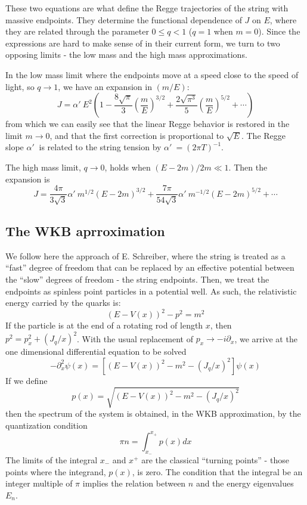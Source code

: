 \documentclass[11pt,a4]{article}
\def\be{\begin{equation}}
\def\ee{\end{equation}}
\newcommand{\alp}{\ensuremath{\alpha'\:}}
\begin{document}
		These two equations are what define the Regge trajectories of the string with massive endpoints. They determine the functional dependence of \(J\) on \(E\), where they are related through the parameter \(0 \leq q < 1\) (\(q = 1\) when \(m = 0\)). Since the expressions are hard to make sense of in their current form, we turn to two opposing limits - the low mass and the high mass approximations.

			In the low mass limit where the endpoints move at a speed close to the speed of light, so \(q \rightarrow 1\), we have an expansion in \((m/E)\):
		\be J = \alp E^2\left(1-\frac{8\sqrt{\pi}}{3}\left(\frac{m}{E}\right)^{3/2} + \frac{2\sqrt{\pi^3}}{5}\left(\frac{m}{E}\right)^{5/2} + \cdots\right) \label{eq:lowMass}\ee
		from which we can easily see that the linear Regge behavior is restored in the limit \(m\rightarrow 0\), and that the first correction is proportional to \(\sqrt{E}\). The Regge slope \(\alp\) is related to the string tension by \(\alp = (2\pi T)^{-1}\).

		The high mass limit, \(q \rightarrow 0\), holds when \((E-2m)/2m \ll 1\). Then the expansion is
		\be J = \frac{4\pi}{3\sqrt{3}}\alp m^{1/2} (E-2m)^{3/2} + \frac{7\pi}{54\sqrt{3}} \alp m^{-1/2} (E-2m)^{5/2}
			+ \cdots \label{eq:highMass} \ee
			
\subsection{The WKB aprroximation}
	We follow here the approach of  E. Schreiber\cite{Schreiber:2004ie}, where the string is treated as a ``fast'' degree of freedom that can be replaced by an effective potential between the ``slow'' degrees of freedom - the string endpoints. Then, we treat the endpoints as spinless point particles in a potential well. As such, the relativistic energy carried by the quarks is:
		\be (E-V(x))^2 - p^2 = m^2 \ee
	If the particle is at the end of a rotating rod of length \(x\), then \(p^2 = p_x^2 + (J_q/x)^2\). With the usual replacement of \(p_x \rightarrow -i\partial_x\), we arrive at the one dimensional differential equation to be solved
		\be -\partial_x^2\psi(x) = \left[\left(E-V(x)\right)^2-m^2-(J_q/x)^2\right]\psi(x) \ee
		If we define
		\be p(x) = \sqrt{(E-V(x))^2-m^2-(J_q/x)^2} \ee
	then the spectrum of the system is obtained, in the WKB approximation, by the quantization condition
		\be \pi n = \int_{x_-}^{x_+} p(x) dx \ee
	The limits of the integral \(x_-\) and \(x^+\) are the classical ``turning points'' - those points where the integrand, \(p(x)\), is zero. The condition that the integral be an integer multiple of \(\pi\) implies the relation between \(n\) and the energy eigenvalues \(E_n\).
\end{document}
